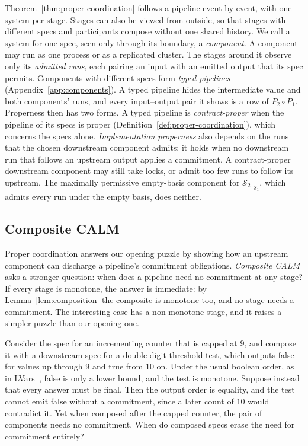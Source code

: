 \documentclass[sigconf]{cidr-2027}
\theoremstyle{remark}
\newcommand{\commitment}{commitment\xspace}
\newcommand{\Spec}{\mathcal{S}}
\begin{document}
\color{blue!70!black}Theorem~\ref{thm:proper-coordination} follows a pipeline event by event,
with one system per stage.  Stages can also be viewed from outside, so that
stages with different specs and participants compose without one shared
history.  We call a system for one spec, seen only
through its boundary, a \emph{component}.  A component may run as one process
or as a replicated cluster.  The stages around it observe only its
\emph{admitted runs}, each pairing an input with an emitted output that its
spec permits.  Components with different specs form \emph{typed pipelines}
(Appendix~\ref{app:components}).  A typed pipeline hides the intermediate
value and both components' runs, and every input--output pair it shows is a
row of $P_2\circ P_1$.  Properness then has two forms.  A typed pipeline is
\emph{contract-proper} when the pipeline of its specs is proper
(Definition~\ref{def:proper-coordination}), which concerns the specs alone.
\emph{Implementation properness} also depends on the runs that the chosen
downstream component admits: it holds when no downstream run that follows
an upstream output applies a \commitment.  A contract-proper downstream component may still take
locks, or admit too few runs to follow its upstream.  The maximally
permissive empty-basis component for $\Spec_2|_{\Spec_1}$, which admits every
run under the empty basis, does neither.\color{black}

\subsection{Composite CALM}
\label{sec:composite-calm}

Proper coordination answers our opening puzzle by showing how an upstream
component can discharge a pipeline's \commitment obligations.
\emph{Composite CALM} asks a stronger question: when does a pipeline need no
\commitment at any stage?  If every stage is monotone, the answer is immediate:
by Lemma~\ref{lem:composition} the composite is monotone too, and no stage needs
a \commitment.  The interesting case has a non-monotone stage, and it raises a
simpler puzzle than our opening one.

Consider the spec for an incrementing counter that is capped at $9$, and
compose it with a downstream spec for a double-digit threshold test, which
outputs \textsf{false} for values up through $9$ and \textsf{true} from $10$ on.
Under the usual boolean order, as in LVars~\cite{kuper2013lvars}, \textsf{false}
is only a lower bound, and the test is monotone.  Suppose instead that every
answer must be final.  Then the output order is equality, and the test cannot
emit \textsf{false} without a \commitment, since a later count of $10$ would
contradict it.  Yet when composed after the capped counter, the pair of
components needs no \commitment.  When do composed specs erase the need for
\commitment entirely?
\end{document}
